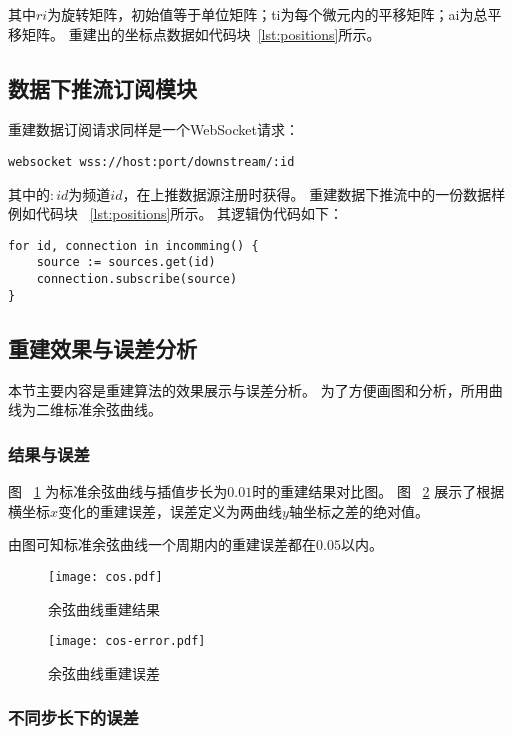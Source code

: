 其中$ri$为旋转矩阵，初始值等于单位矩阵；ti为每个微元内的平移矩阵；ai为总平移矩阵。
重建出的坐标点数据如代码块~\ref{lst:positions}所示。

\subsection{数据下推流订阅模块}

重建数据订阅请求同样是一个WebSocket请求：

\begin{lstlisting}[label={lst:subscribe},caption={重建数据订阅}]
websocket wss://host:port/downstream/:id
\end{lstlisting}

其中的$:id$为频道$id$，在上推数据源注册时获得。
重建数据下推流中的一份数据样例如代码块 ~\ref{lst:positions}所示。
其逻辑伪代码如下：

\begin{lstlisting}[caption={订阅数据源}]
for id, connection in incomming() {
    source := sources.get(id)
    connection.subscribe(source)
}
\end{lstlisting}

\subsection{重建效果与误差分析}

本节主要内容是重建算法的效果展示与误差分析。
为了方便画图和分析，所用曲线为二维标准余弦曲线。

\subsubsection{结果与误差}

图 ~\ref{fig:cos} 为标准余弦曲线与插值步长为$0.01$时的重建结果对比图。
图 ~\ref{fig:cos-error} 展示了根据横坐标$x$变化的重建误差，误差定义为两曲线$y$轴坐标之差的绝对值。

由图可知标准余弦曲线一个周期内的重建误差都在$0.05$以内。


\begin{figure}[H]
\centering
\texttt{[image: cos.pdf]}
\caption{余弦曲线重建结果}
\label{fig:cos}
\end{figure}

\begin{figure}[H]
\centering
\texttt{[image: cos-error.pdf]}
\caption{余弦曲线重建误差}
\label{fig:cos-error}
\end{figure}

\subsubsection{不同步长下的误差}

